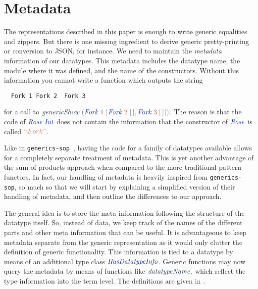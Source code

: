 \documentclass[screen,sigplan]{acmart}%
\newcommand*{\mathcolor}{}
\def\mathcolor#1#{\mathcoloraux{#1}}
\newcommand*{\mathcoloraux}[3]{%
  \protect\leavevmode
  \begingroup
    \color#1{#2}#3%
  \endgroup
}
\newcommand{\HSNumeral}[1]{\mathcolor{hsred3}{#1}}
\newcommand{\HSString}[1]{\mathcolor{hsred2}{#1}}
\newcommand{\HSSpecial}[1]{\mathcolor{hsblue4}{#1}}
\newcommand{\HSSym}[1]{\mathcolor{hsblue4}{#1}}
\newcommand{\HSCon}[1]{\mathcolor{hsblue3}{\mathit{#1}}}
\newcommand{\HSVar}[1]{\mathcolor{hsblue5}{\mathit{#1}}}
\begin{document}
\section{Metadata}
\label{sec:metadata}

  The representations described in this paper is enough to write generic equalities
and zippers. But there is one missing ingredient to derive generic
pretty-printing or conversion to JSON, for instance. We need to maintain
the \emph{metadata} information of our datatypes.
This metadata includes the datatype name, the module where it was defined,
and the name of the constructors. Without this
information you cannot write a function which outputs the string
\begin{tabbing}\tt
~Fork~1~Fork~2~~Fork~3~
\end{tabbing}
for a call to \ensuremath{\HSVar{genericShow}\;\HSSpecial{(}\HSCon{Fork}\;\HSNumeral{1}\;\HSSpecial{\HSSym{[\mskip1.5mu} }\HSCon{Fork}\;\HSNumeral{2}\;\HSSpecial{\HSSym{[\mskip1.5mu} }\HSSpecial{\HSSym{\mskip1.5mu]}}\HSSpecial{,}\HSCon{Fork}\;\HSNumeral{3}\;\HSSpecial{\HSSym{[\mskip1.5mu} }\HSSpecial{\HSSym{\mskip1.5mu]}}\HSSpecial{\HSSym{\mskip1.5mu]}}\HSSpecial{)}}. The reason is that
the code of \ensuremath{\HSCon{Rose}\;\HSCon{Int}} does not contain the information that the constructor
of \ensuremath{\HSCon{Rose}} is called \ensuremath{\HSString{``Fork\char34 }}.

  Like in \texttt{generics-sop}~\cite{deVries2014}, having the code
for a family of datatypes available allows for a completely separate
treatment of metadata. This is yet another advantage of the
sum-of-products approach when compared to the more traditional pattern
functors. In fact, our handling of metadata is heavily inspired from
\texttt{generics-sop}, so much so that we will start by explaining a simplified version of
their handling of metadata, and then outline the differences to our approach. 

  The general idea is to store the meta information following the structure of
the datatype itself. So, instead of data, we keep track of the names of the
different parts and other meta information that can be useful. It is advantageous
to keep metadata separate from the generic representation as it would only
clutter the definition of generic functionality.
This information is tied to a datatype by means of an additional type class
\ensuremath{\HSCon{HasDatatypeInfo}}.
Generic functions may now query the metadata by means of functions like
\ensuremath{\HSVar{datatypeName}}, which reflect the type information into the term level.
The definitions are given in .
\end{document}
